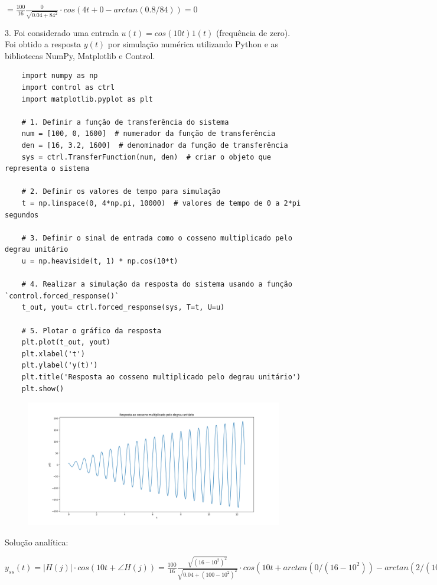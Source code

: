 \documentclass[10pt]{article}
\begin{document}
$= \frac{100}{16} \frac{0}{\sqrt{0.04 + 84^2}} \cdot cos(4 t + 0 - arctan(0.8/84)) = 0$

3. Foi considerado uma entrada $u(t) = cos(10 t) 1(t)$ (frequência de zero). Foi obtido a resposta $y(t)$ por simulação numérica utilizando Python
e as bibliotecas NumPy, Matplotlib e Control.

\begin{verbatim}
    import numpy as np
    import control as ctrl
    import matplotlib.pyplot as plt

    # 1. Definir a função de transferência do sistema
    num = [100, 0, 1600]  # numerador da função de transferência
    den = [16, 3.2, 1600]  # denominador da função de transferência
    sys = ctrl.TransferFunction(num, den)  # criar o objeto que representa o sistema

    # 2. Definir os valores de tempo para simulação
    t = np.linspace(0, 4*np.pi, 10000)  # valores de tempo de 0 a 2*pi segundos

    # 3. Definir o sinal de entrada como o cosseno multiplicado pelo degrau unitário
    u = np.heaviside(t, 1) * np.cos(10*t)

    # 4. Realizar a simulação da resposta do sistema usando a função `control.forced_response()`
    t_out, yout= ctrl.forced_response(sys, T=t, U=u)

    # 5. Plotar o gráfico da resposta
    plt.plot(t_out, yout)
    plt.xlabel('t')
    plt.ylabel('y(t)')
    plt.title('Resposta ao cosseno multiplicado pelo degrau unitário')
    plt.show()
\end{verbatim}

\begin{figure}[h]
    \includegraphics[scale=0.4]{questao3.png}
    \centering
\end{figure}

Solução analítica:

$y_{ss}(t) = |H(j)| \cdot cos(10 t + \angle H(j)) = \frac{100}{16} \frac{\sqrt{(16-10^2)^2}}{\sqrt{0.04 + (100 - 10^2)^2}} \cdot cos(10 t + arctan(0/(16 - 10^2)) - arctan(2/(100 - 10^2))) =$
\end{document}
